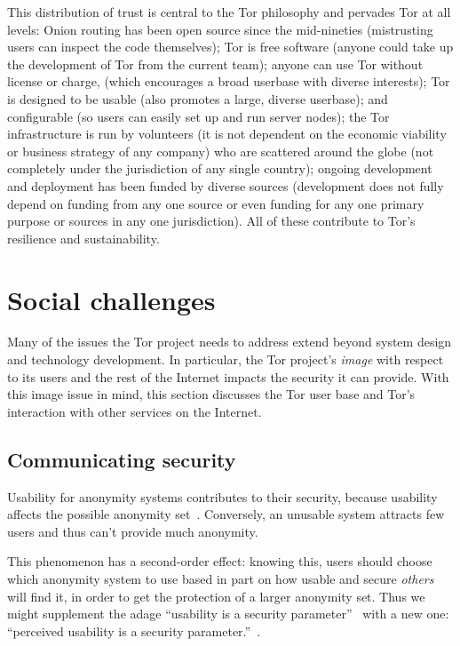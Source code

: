 \documentclass{llncs}
\begin{document}
This distribution of trust is central to the Tor philosophy and
pervades Tor at all levels: Onion routing has been open source since
the mid-nineties (mistrusting users can inspect the code themselves);
Tor is free software (anyone could take up the development of Tor from
the current team); anyone can use Tor without license or charge, (which
encourages a broad userbase with diverse interests); Tor is designed to be
usable (also promotes a large, diverse userbase); and configurable (so
users can easily set up and run server nodes); the Tor
infrastructure is run by volunteers (it is not dependent on the
economic viability or business strategy of any company) who are
scattered around the globe (not completely under the jurisdiction of
any single country); ongoing development and deployment has been
funded by diverse sources (development does not fully depend on
funding from any one source or even funding for any one primary
purpose or sources in any one jurisdiction). All of these contribute
to Tor's resilience and sustainability.


\section{Social challenges}

Many of the issues the Tor project needs to address extend beyond
system design and technology development. In particular, the Tor
project's \emph{image} with respect to its users and the rest of the
Internet impacts the security it can provide.  With this image issue
in mind, this section discusses the Tor user base and Tor's
interaction with other services on the Internet.

\subsection{Communicating security}

Usability for anonymity systems contributes to their security, because
usability affects the possible anonymity set~\cite{econymics,back01}.
Conversely, an unusable system attracts few users and thus can't
provide much anonymity.

This phenomenon has a second-order effect: knowing this, users should
choose which anonymity system to use based in part on how usable and
secure \emph{others} will find it, in order to get the protection of a
larger anonymity set. Thus we might supplement the adage ``usability
is a security parameter''~\cite{back01} with a new one: ``perceived
usability is a security parameter.''~\cite{usability-network-effect}.
\end{document}
